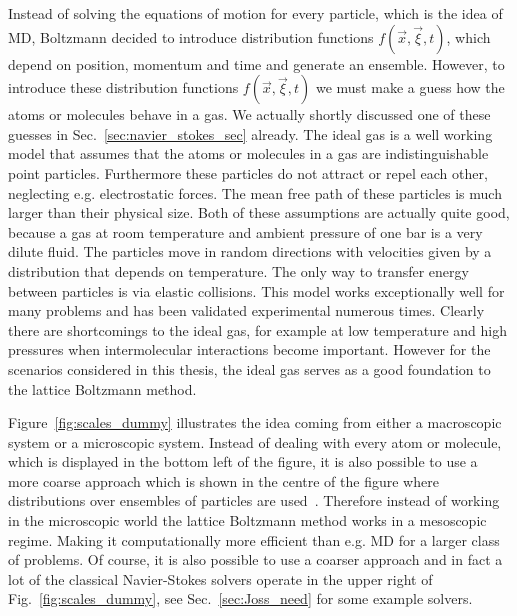 Instead of solving the equations of motion for every particle, which is the idea of MD, Boltzmann decided to introduce distribution functions $f(\vec{x},\vec{\xi},t)$, which depend on position, momentum and time and generate an ensemble.
However, to introduce these distribution functions $f(\vec{x},\vec{\xi},t)$ we must make a guess how the atoms or molecules behave in a gas.
We actually shortly discussed one of these guesses in Sec.~\ref{sec:navier_stokes_sec} already. 
The ideal gas is a well working model that assumes that the atoms or molecules in a gas are indistinguishable point particles. 
Furthermore these particles do not attract or repel each other, neglecting e.g. electrostatic forces.
The mean free path of these particles is much larger than their physical size.
Both of these assumptions are actually quite good, because a gas at room temperature and ambient pressure of one bar is a very dilute fluid.
The particles move in random directions with velocities given by a distribution that depends on temperature. 
The only way to transfer energy between particles is via elastic collisions.
This model works exceptionally well for many problems and has been validated experimental numerous times.
Clearly there are shortcomings to the ideal gas, for example at low temperature and high pressures when intermolecular interactions become important.
However for the scenarios considered in this thesis, the ideal gas serves as a good foundation to the lattice Boltzmann method.

Figure~\ref{fig:scales_dummy} illustrates the idea coming from either a macroscopic system or a microscopic system.
Instead of dealing with every atom or molecule, which is displayed in the bottom left of the figure, it is also possible to use a more coarse approach which is shown in the centre of the figure where distributions over ensembles of particles are used~\cite{raabeOverviewLatticeBoltzmann2004}.
Therefore instead of working in the microscopic world the lattice Boltzmann method works in a mesoscopic regime.
Making it computationally more efficient than e.g. MD for a larger class of problems.
Of course, it is also possible to use a coarser approach and in fact a lot of the classical Navier-Stokes solvers operate in the upper right of Fig.~\ref{fig:scales_dummy}, see Sec.~\ref{sec:Joss_need} for some example solvers.

